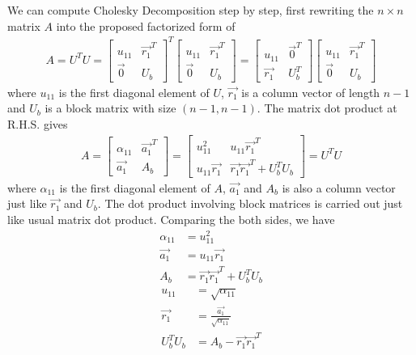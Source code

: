We can compute Cholesky Decomposition step by step, first rewriting the $n \times n$ matrix $A$ into the proposed factorized form of
\begin{align*}
A = U^T U = 
\begin{bmatrix}
u_{11} & \vec{r_1}^T \\
\vec{0} & U_b 
\end{bmatrix}^T
\begin{bmatrix}
u_{11} & \vec{r_1}^T \\
\vec{0} & U_b 
\end{bmatrix} = 
\begin{bmatrix}
u_{11} & \vec{0}^T \\
\vec{r_1} & U_b^T
\end{bmatrix}
\begin{bmatrix}
u_{11} & \vec{r_1}^T \\
\vec{0} & U_b 
\end{bmatrix}
\end{align*}
where $u_{11}$ is the first diagonal element of $U$, $\vec{r_1}$ is a column vector of length $n-1$ and $U_b$ is a block matrix with size $(n-1, n-1)$. The matrix dot product at R.H.S. gives
\begin{align*}
A = 
\begin{bmatrix}
\alpha_{11} & \vec{a_1}^T \\
\vec{a_1} & A_b 
\end{bmatrix}
=
\begin{bmatrix}
u_{11}^2 & u_{11}\vec{r_1}^T \\
u_{11}\vec{r_1} & \vec{r_1}\vec{r_1}^T + U_b^T U_b
\end{bmatrix}
= U^TU
\end{align*}
where $\alpha_{11}$ is the first diagonal element of $A$, $\vec{a_1}$ and $A_b$ is also a column vector just like $\vec{r_1}$ and $U_b$. The dot product involving block matrices is carried out just like usual matrix dot product. Comparing the both sides, we have
\begin{align*}
\alpha_{11} &= u_{11}^2 \\
\vec{a_1} &= u_{11}\vec{r_1} \\
A_b &= \vec{r_1}\vec{r_1}^T + U_b^T U_b
\end{align*}
\begin{align*}
u_{11} &= \sqrt{\alpha_{11}} \\
\vec{r_1} &= \frac{\vec{a_1}}{\sqrt{\alpha_{11}}} \\
U_b^T U_b &= A_b - \vec{r_1}\vec{r_1}^T
\end{align*}
